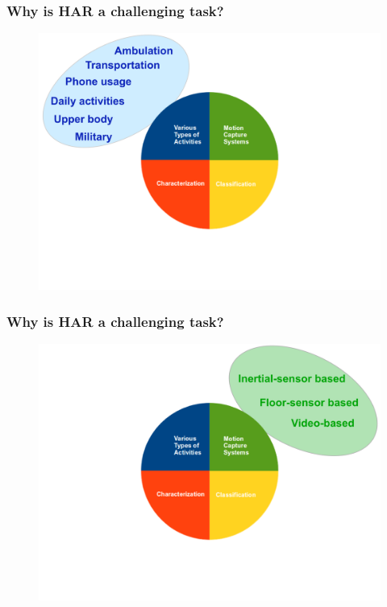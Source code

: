 \documentclass{beamer}
\begin{document}
\begin{frame}
	\frametitle{Why is HAR a challenging task?}
\vspace{-0.5cm}
\begin{figure}
 \includegraphics[scale=.3]{har02}
\vspace{-0.6cm}
\end{figure}
\end{frame}

\begin{frame}
	\frametitle{Why is HAR a challenging task?}
\vspace{-0.5cm}
\begin{figure}
 \includegraphics[scale=.3]{har03}
\vspace{-0.6cm}
\end{figure}
\end{frame}
\end{document}
